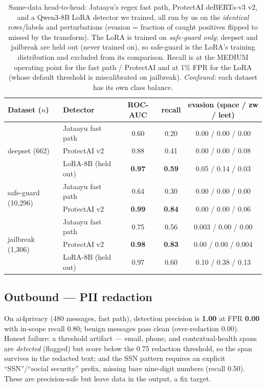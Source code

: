 \documentclass[11pt]{article}
\newcommand{\good}[1]{\textcolor{good}{\textbf{#1}}}
\begin{document}
\begin{table}[htbp]\centering\small
\setlength\tabcolsep{4pt}
\caption{Same-data head-to-head: Jataayu's regex fast path, ProtectAI deBERTa-v3 v2, and a
Qwen3-8B LoRA detector we trained, all run by us on the \emph{identical} rows/labels and
perturbations (evasion = fraction of caught positives flipped to missed by the transform).
The LoRA is trained on \emph{safe-guard only}; deepset and jailbreak are held out (never trained on),
so safe-guard is the LoRA's training distribution and excluded from its comparison. Recall is at the
MEDIUM operating point for the fast path / ProtectAI and at 1\% FPR for the LoRA (whose default
threshold is miscalibrated on jailbreak). \emph{Confound:} each dataset has its own class balance.}
\label{tab:pi}
\begin{tabular}{llcccc}
\toprule
Dataset ($n$) & Detector & ROC-AUC & recall & \multicolumn{2}{c}{evasion (space / zw / leet)} \\
\midrule
\multirow{3}{*}{deepset (662)} & Jataayu fast path & 0.60 & 0.20 & \multicolumn{2}{c}{0.00 / 0.00 / 0.00} \\
 & ProtectAI v2 & 0.88 & 0.41 & \multicolumn{2}{c}{0.00 / 0.00 / 0.08} \\
 & LoRA-8B (held out) & \good{0.97} & \good{0.59} & \multicolumn{2}{c}{0.05 / 0.14 / 0.03} \\
\midrule
\multirow{2}{*}{safe-guard (10{,}296)} & Jataayu fast path & 0.64 & 0.30 & \multicolumn{2}{c}{0.00 / 0.00 / 0.00} \\
 & ProtectAI v2 & \good{0.99} & \good{0.84} & \multicolumn{2}{c}{0.00 / 0.00 / 0.06} \\
\midrule
\multirow{3}{*}{jailbreak (1{,}306)} & Jataayu fast path & 0.75 & 0.56 & \multicolumn{2}{c}{0.003 / 0.00 / 0.00} \\
 & ProtectAI v2 & \good{0.98} & \good{0.83} & \multicolumn{2}{c}{0.00 / 0.00 / 0.004} \\
 & LoRA-8B (held out) & 0.97 & 0.60 & \multicolumn{2}{c}{0.10 / 0.38 / 0.13} \\
\bottomrule
\end{tabular}
\end{table}

\subsection{Outbound --- PII redaction}
On ai4privacy (480 messages, fast path), detection precision is \good{1.00} at FPR \good{0.00}
with in-scope recall 0.80; benign messages pass clean (over-redaction 0.00). Honest failure: a
threshold artifact --- email, phone, and contextual-health spans are \emph{detected} (flagged)
but score below the 0.75 redaction threshold, so the span survives in the redacted text; and the
SSN pattern requires an explicit ``SSN''/``social security'' prefix, missing bare nine-digit
numbers (recall 0.50). These are precision-safe but leave data in the output, a fix target.
\end{document}
